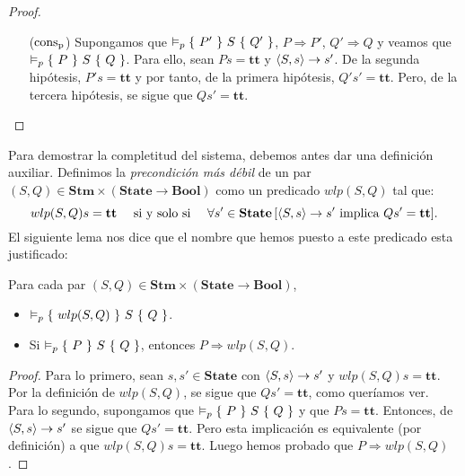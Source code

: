 \begin{proof}
\begin{itemize}
    \item[($\mathrm{cons}_{\mathrm{p}}$)] Supongamos que $\vDash_p \{\, \, P' \, \, \}\, \, S\, \, \{ \, \, Q' \, \, \}$, $P \Rightarrow P'$, $Q' \Rightarrow Q$ y veamos que $\vDash_p \{\, \, P \, \, \}\, \, S\, \, \{ \, \, Q \, \, \}$. Para ello, sean $Ps = \mathbf{tt}$ y $\langle S, s \rangle\to s'$. De la segunda hipótesis, $P's = \mathbf{tt}$ y por tanto, de la primera hipótesis, $Q's' = \mathbf{tt}$. Pero, de la tercera hipótesis, se sigue que $Qs' = \mathbf{tt}$.
\end{itemize}
\end{proof}

Para demostrar la completitud del sistema, debemos antes dar una definición auxiliar. Definimos la \textit{precondición más débil} de un par $(S, Q) \in \mathbf{Stm}\times(\mathbf{State} \to \mathbf{Bool})$ como un predicado $wlp(S, Q)$ tal que:
$$wlp(S, Q)s = \mathbf{tt} \quad \text{ si y solo si }\quad \forall s' \in \mathbf{State}\, [\langle S, s \rangle\to s' \text{ implica } Qs' = \mathbf{tt}].$$
El siguiente lema nos dice que el nombre que hemos puesto a este predicado esta justificado: 

\begin{lema}
Para cada par $(S,  Q)\in \mathbf{Stm}\times(\mathbf{State} \to \mathbf{Bool})$, 
\begin{itemize}
    \item $\vDash_p \{\, \, wlp(S, Q) \, \, \}\, \, S\, \, \{ \, \, Q \, \, \}$.
    \item Si $\vDash_p \{\, \, P \, \, \}\, \, S\, \, \{ \, \, Q \, \, \}$, entonces $P \Rightarrow wlp(S, Q)$.
\end{itemize}
\end{lema}
\begin{proof}
Para lo primero, sean $s, s' \in \mathbf{State}$ con $\langle S, s \rangle\to s'$ y $wlp(S, Q)s = \mathbf{tt}$. Por la definición de $wlp(S, Q)$, se sigue que $Qs' = \mathbf{tt}$, como queríamos ver. 
\\

Para lo segundo, supongamos que $\vDash_p \{\, \, P \, \, \}\, \, S\, \, \{ \, \, Q \, \, \}$ y que $Ps = \mathbf{tt}$. Entonces, de $\langle S, s \rangle\to s'$ se sigue que $Qs' = \mathbf{tt}$. Pero esta implicación es equivalente (por definición) a que $wlp(S, Q)s = \mathbf{tt}$. Luego hemos probado que $P \Rightarrow wlp(S, Q)$. 
\end{proof}

